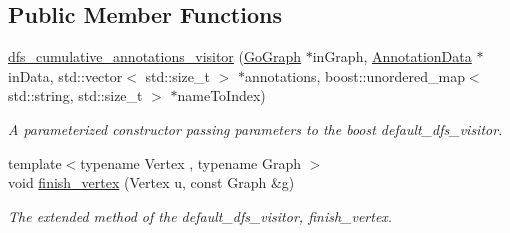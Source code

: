 \subsection*{Public Member Functions}
\begin{DoxyCompactItemize}
\item 
\hyperlink{classTermProbabilityMap_1_1dfs__cumulative__annotations__visitor_a3c6b493a2f9b5b966f12c947553ffbd2}{dfs\+\_\+cumulative\+\_\+annotations\+\_\+visitor} (\hyperlink{classGoGraph}{Go\+Graph} $\ast$in\+Graph, \hyperlink{classAnnotationData}{Annotation\+Data} $\ast$in\+Data, std\+::vector$<$ std\+::size\+\_\+t $>$ $\ast$annotations, boost\+::unordered\+\_\+map$<$ std\+::string, std\+::size\+\_\+t $>$ $\ast$name\+To\+Index)\hypertarget{classTermProbabilityMap_1_1dfs__cumulative__annotations__visitor_a3c6b493a2f9b5b966f12c947553ffbd2}{}\label{classTermProbabilityMap_1_1dfs__cumulative__annotations__visitor_a3c6b493a2f9b5b966f12c947553ffbd2}

\begin{DoxyCompactList}\small\item\em A parameterized constructor passing parameters to the boost default\+\_\+dfs\+\_\+visitor. \end{DoxyCompactList}\item 
{\footnotesize template$<$typename Vertex , typename Graph $>$ }\\void \hyperlink{classTermProbabilityMap_1_1dfs__cumulative__annotations__visitor_ac6147a4c2bcfe83492667b248630a525}{finish\+\_\+vertex} (Vertex u, const Graph \&g)
\begin{DoxyCompactList}\small\item\em The extended method of the default\+\_\+dfs\+\_\+visitor, finish\+\_\+vertex. \end{DoxyCompactList}\end{DoxyCompactItemize}
